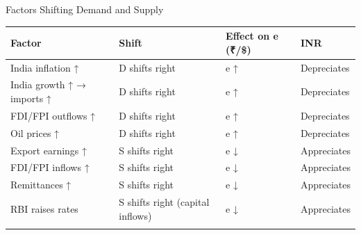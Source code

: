 \documentclass[
  ignorenonframetext,
  aspectratio=169,
]{beamer}
\makeatletter
\let\quarto@originallabel\label
\DeclareRobustCommand*{\label}[1]{\quarto@originallabel{#1}}
\makeatother
\begin{document}
\begin{frame}{Factors Shifting Demand and Supply}
\label{factors-shifting-demand-and-supply}
\begin{longtable}[]{@{}
  >{\raggedright\arraybackslash}p{}
  >{\raggedright\arraybackslash}p{}
  >{\raggedright\arraybackslash}p{}
  >{\raggedright\arraybackslash}p{}@{}}
\toprule\noalign{}
\begin{minipage}[b]{\linewidth}\raggedright
Factor
\end{minipage} & \begin{minipage}[b]{\linewidth}\raggedright
Shift
\end{minipage} & \begin{minipage}[b]{\linewidth}\raggedright
Effect on e (₹/\$)
\end{minipage} & \begin{minipage}[b]{\linewidth}\raggedright
INR
\end{minipage} \\
\midrule\noalign{}
\endhead
India inflation ↑ & D shifts right & e ↑ & Depreciates \\
India growth ↑ → imports ↑ & D shifts right & e ↑ & Depreciates \\
FDI/FPI outflows ↑ & D shifts right & e ↑ & Depreciates \\
Oil prices ↑ & D shifts right & e ↑ & Depreciates \\
Export earnings ↑ & S shifts right & e ↓ & Appreciates \\
FDI/FPI inflows ↑ & S shifts right & e ↓ & Appreciates \\
Remittances ↑ & S shifts right & e ↓ & Appreciates \\
RBI raises rates & S shifts right (capital inflows) & e ↓ &
Appreciates \\
\bottomrule\noalign{}
\end{longtable}

\end{frame}
\end{document}
